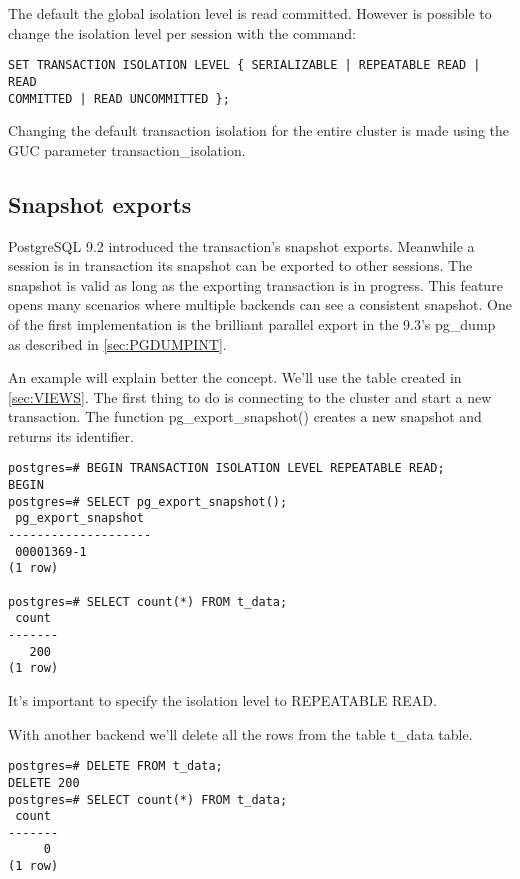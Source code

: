 The default the global isolation level is read committed. However is possible to change the
isolation level per session with the command:
\begin{lstlisting}[style=pgsql]
SET TRANSACTION ISOLATION LEVEL { SERIALIZABLE | REPEATABLE READ | READ 
COMMITTED | READ UNCOMMITTED }; 
\end{lstlisting}

Changing the default transaction isolation for the entire cluster is made using the GUC parameter
transaction\_isolation.


\subsection{Snapshot exports}
\label{sub:SNAPEXPORT}
PostgreSQL 9.2 introduced the transaction's snapshot exports. Meanwhile a session is in
transaction its snapshot can be exported to other sessions. The snapshot is valid as long as the
exporting transaction is in progress. This feature opens many scenarios where multiple backends
can see a consistent snapshot. One of the first implementation is the brilliant parallel export in 
the 9.3's pg\_dump as described in \ref{sec:PGDUMPINT}.\newline

An example will explain better the concept. We'll use the table created in \ref{sec:VIEWS}.
The first thing to do is connecting to the cluster and start a new transaction. The function
pg\_export\_snapshot() creates a new snapshot and returns its identifier.

\begin{lstlisting}[style=pgsql]
postgres=# BEGIN TRANSACTION ISOLATION LEVEL REPEATABLE READ;
BEGIN
postgres=# SELECT pg_export_snapshot();
 pg_export_snapshot 
--------------------
 00001369-1
(1 row)

postgres=# SELECT count(*) FROM t_data;
 count 
-------
   200
(1 row)

\end{lstlisting}

It's important to specify the isolation level to REPEATABLE READ. 


With another backend we'll delete all the rows from the table t\_data table.

\begin{lstlisting}[style=pgsql]
postgres=# DELETE FROM t_data;
DELETE 200
postgres=# SELECT count(*) FROM t_data;
 count 
-------
     0
(1 row)

\end{lstlisting}

